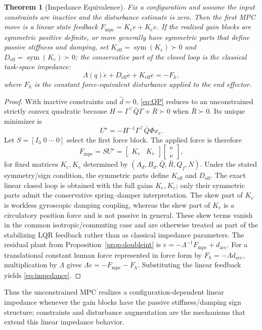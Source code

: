 \documentclass[journal]{IEEEtran}
\newtheorem{theorem}{Theorem}
\newcommand{\Fmpc}{F_{\text{mpc}}}
\newcommand{\dhat}{\hat{d}}
\begin{document}
\begin{theorem}[Impedance Equivalence]\label{thm:equiv}
Fix a configuration and assume the input constraints are inactive and
the disturbance estimate is zero. Then the first MPC move is a linear
state feedback
$\Fmpc=K_e e+K_{\dot e}\dot e$. If the realized gain blocks are symmetric
positive definite, or more generally have symmetric parts that define passive
stiffness and damping, set
$K_{\text{eff}}=\operatorname{sym}(K_e)\succ0$ and
$D_{\text{eff}}=\operatorname{sym}(K_{\dot e})\succ0$; the conservative part
of the closed loop is the classical task-space impedance:
\begin{equation}\label{eq:impedance}
  \Lambda(q)\ddot{e}+D_{\text{eff}}\dot{e}+K_{\text{eff}}e = -F_h,
\end{equation}
where $F_h$ is the constant force-equivalent disturbance applied to the
end effector.
\end{theorem}
\begin{proof}
With inactive constraints and $\dhat=0$, \eqref{eq:QP} reduces to an
unconstrained strictly convex quadratic because
$H=\Gamma^\top\bar Q\Gamma+\bar R\succ0$ when $\bar R\succ0$. Its
unique minimizer is
\begin{equation*}
  U^\star=-H^{-1}\Gamma^\top\bar Q\Phi x_e .
\end{equation*}
Let $S=[I_3\;0\;\cdots\;0]$ select the first force block. The applied
force is therefore
\begin{equation*}
  \Fmpc=S U^\star =
  \begin{bmatrix}K_e&K_{\dot e}\end{bmatrix}
  \begin{bmatrix}e\\\dot e\end{bmatrix},
\end{equation*}
for fixed matrices $K_e,K_{\dot e}$ determined by
$(A_d,B_d,\bar Q,\bar R,Q_f,N)$. Under the stated symmetry/sign condition,
the symmetric parts define $K_{\text{eff}}$ and $D_{\text{eff}}$. The exact
linear closed loop is obtained with the full gains $K_e,K_{\dot e}$; only
their symmetric parts admit the conservative spring--damper interpretation.
The skew part of $K_{\dot e}$ is workless gyroscopic damping coupling, whereas
the skew part of $K_e$ is a circulatory position force and is not passive in
general. These skew terms vanish in the common isotropic/commuting case and
are otherwise treated as part of the stabilizing LQR feedback rather than as
classical impedance parameters. The residual plant
from Proposition~\ref{prop:doubleint} is
$\ddot e=-\Lambda^{-1}\Fmpc+d_{\text{acc}}$. For a translational
constant human force represented in force form by $F_h=-\Lambda
d_{\text{acc}}$, multiplication by $\Lambda$ gives
$\Lambda\ddot e=-\Fmpc-F_h$. Substituting the linear feedback yields
\eqref{eq:impedance}.
\end{proof}
Thus the unconstrained MPC realizes a configuration-dependent linear
impedance whenever the gain blocks have the passive stiffness/damping
sign structure; constraints and disturbance augmentation are the
mechanisms that extend this linear impedance behavior.
\end{document}
